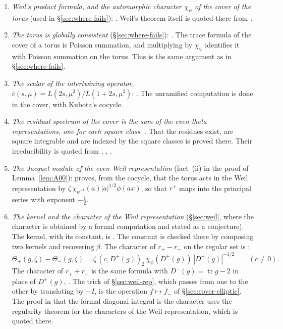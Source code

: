 \documentclass[12pt,letterpaper,openany]{book}
\theoremstyle{plain}
\theoremstyle{definition}
\theoremstyle{remark}
\theoremstyle{remark}
\newcommand{\tr}{\operatorname{tr}}
\begin{document}
\begin{enumerate}
\item \emph{Weil's product formula, and the automorphic character
$\chi_\psi$ of the cover of the torus} (used in \S\ref{sec:where-fails}):
\cite[Lemma~3.3]{JC}. Weil's theorem itself is quoted there from
\cite{We3}.
\item \emph{The torus is globally consistent} (\S\ref{sec:where-fails}):
\cite[Theorem~3.4 and Lemma~3.5]{JC}. The trace formula of the cover of a
torus is Poisson summation, and multiplying by $\chi_\psi$ identifies it
with Poisson summation on the torus. This is the same argument as in
\S\ref{sec:where-fails}.
\item \emph{The scalar of the intertwining operator},
$\overline c(s,\mu)=L(2s,\mu^2)/L(1+2s,\mu^2)$:
\cite[Lemma~5.6]{JC}. The unramified computation is done in the cover,
with Kubota's cocycle.
\item \emph{The residual spectrum of the cover is the sum of the even
theta representations, one for each square class}:
\cite[Theorem~5.8]{JC}. That the residues exist, are square integrable
and are indexed by the square classes is proved there. Their
irreducibility is quoted from \cite{Ge2}, \cite{GePS}, \cite{Wa1}.
\item \emph{The Jacquet module of the even Weil representation}
(fact~(ii) in the proof of Lemma~\ref{lem:A00}): \cite[Lemma~5.7]{JC}
proves, from the cocycle, that the torus acts in the Weil representation
by $\zeta\,\chi_{\psi^{-1}}(a)|a|^{1/2}\phi(ax)$, so that $r^+$ maps into
the principal series with exponent $-\frac12$.
\item \emph{The kernel and the character of the Weil representation}
(\S\ref{sec:weil}, where the character is obtained by a formal
computation and stated as a conjecture). The kernel, with its constant,
is \cite[Lemma~7.4]{JC}. The constant is checked there by composing two
kernels and recovering $\beta$. The character of $r_+-r_-$ on the
regular set is \cite[Proposition~7.5]{JC}:
\[
\Theta_+(g,\zeta)-\Theta_-(g,\zeta)=\zeta\,(c,D^+(g))_2\,\chi_\psi(D^+(g))\,
|D^+(g)|^{-1/2}\qquad(c\neq0).
\]
The character of $r_++r_-$ is the same formula with $D^-(g)=\tr g-2$ in
place of $D^+(g)$, \cite[(7.7)]{JC}. The trick of \S\ref{sec:weil-rep},
which passes from one to the other by translating by $-I$, is the
operation $\overline f\mapsto\overline f_-$ of
\S\ref{sec:cover-elliptic}. The proof in \cite{JC} that the formal
diagonal integral is the character uses the regularity theorem for the
characters of the Weil representation, which is quoted there.
\end{enumerate}
\end{document}
